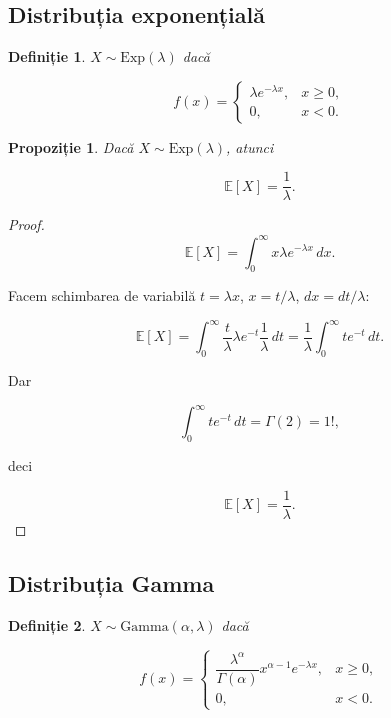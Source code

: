 \documentclass[12pt]{article}
\theoremstyle{plain}
\newtheorem{definition}{Definiție}
\newtheorem{proposition}{Propoziție}
\begin{document}
\subsection{Distribuția exponențială}

\begin{definition}
$X \sim \mathrm{Exp}(\lambda)$ dacă


\[
f(x) =
\begin{cases}
\lambda e^{-\lambda x}, & x \ge 0,\\
0, & x < 0.
\end{cases}
\]


\end{definition}

\begin{proposition}
Dacă $X \sim \mathrm{Exp}(\lambda)$, atunci


\[
\mathbb{E}[X] = \frac{1}{\lambda}.
\]


\end{proposition}

\begin{proof}


\[
\mathbb{E}[X] = \int_0^{\infty} x \lambda e^{-\lambda x}\, dx.
\]


Facem schimbarea de variabilă $t = \lambda x$, $x = t/\lambda$, $dx = dt/\lambda$:


\[
\mathbb{E}[X] = \int_0^{\infty} \frac{t}{\lambda} \lambda e^{-t} \frac{1}{\lambda}\, dt
= \frac{1}{\lambda} \int_0^{\infty} t e^{-t}\, dt.
\]


Dar


\[
\int_0^{\infty} t e^{-t}\, dt = \Gamma(2) = 1!,
\]


deci


\[
\mathbb{E}[X] = \frac{1}{\lambda}.
\]


\end{proof}

\subsection{Distribuția Gamma}

\begin{definition}
$X \sim \mathrm{Gamma}(\alpha,\lambda)$ dacă


\[
f(x) =
\begin{cases}
\dfrac{\lambda^\alpha}{\Gamma(\alpha)} x^{\alpha - 1} e^{-\lambda x}, & x \ge 0,\\[6pt]
0, & x < 0.
\end{cases}
\]


\end{definition}
\end{document}
